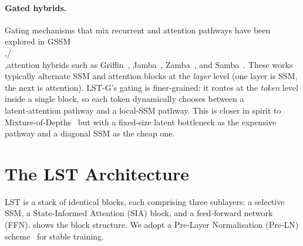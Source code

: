 \documentclass[10pt,twocolumn,letterpaper]{article}
\newcommand{\LST}{\textsc{LST}}
\newcommand{\SIA}{\textsc{SIA}}
\begin{document}
\paragraph{Gated hybrids.}  Gating mechanisms that mix recurrent and attention pathways have been explored in GSSM\\,/\\,attention hybrids such as Griffin~\cite{de2024griffin}, Jamba~\cite{anthony2024jamba}, Zamba~\cite{zoq2024zamba}, and Samba~\cite{ren2024samba}.  These works typically alternate SSM and attention blocks at the \emph{layer} level (one layer is SSM, the next is attention).  \LST-G{}'s gating is finer‑grained: it routes at the \emph{token} level inside a single block, so each token dynamically chooses between a latent‑attention pathway and a local‑SSM pathway.  This is closer in spirit to Mixture‑of‑Depths~\cite{yang2024gated} but with a fixed‑size latent bottleneck as the expensive pathway and a diagonal SSM as the cheap one.

\section{The \LST{} Architecture}
\label{sec:arch}

\LST{} is a stack of identical blocks, each comprising three sublayers: a selective SSM, a State‑Informed Attention (\SIA{}) block, and a feed‑forward network (FFN).   shows the block structure.  We adopt a Pre‑Layer Normalisation (Pre‑LN) scheme~\cite{xiong2020layer} for stable training.
\end{document}
